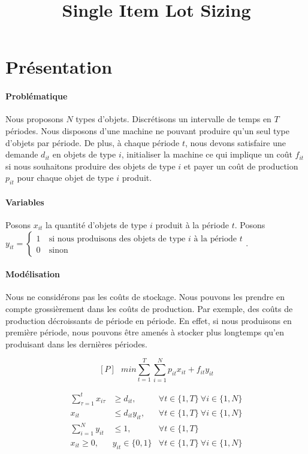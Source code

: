\documentclass[12pt,a4paper]{article}
\title{Single Item Lot Sizing}
\date{}
\begin{document}
	\maketitle
	
	\section*{Présentation}
	
	\paragraph{Problématique} Nous proposons $N$ types d'objets. Discrétisons un intervalle de temps en $T$ périodes. Nous disposons d'une machine ne pouvant produire qu'un seul type d'objets par période. \medbreak De plus, à chaque période $t$, nous devons satisfaire une demande $d_{it}$ en objets de type $i$, initialiser la machine ce qui implique un coût $f_{it}$ si nous souhaitons produire des objets de type $i$ et payer un coût de production $p_{it}$ pour chaque objet de type $i$ produit.
	
	\paragraph{Variables}
	Posons $x_{it}$ la quantité d'objets de type $i$ produit à la période $t$. \medbreak Posons $y_{it} = \left\lbrace \begin{aligned}
	1 ~& \text{si nous produisons des objets de type }i \text{ à la période } t \\
	0 ~& \text{sinon}
\end{aligned}	 \right.$.

 	\paragraph{Modélisation} Nous ne considérons pas les coûts de stockage. Nous pouvons les prendre en compte grossièrement dans les coûts de production. Par exemple, des coûts de production décroissants de période en période. En effet, si nous produisons en première période, nous pouvons être amenés à stocker plus longtemps qu'en produisant dans les dernières périodes.
 	
 	$$ [P] ~~~ min \sum_{t=1}^{T} \sum_{i=1}^{N} p_{it}x_{it} + f_{it} y_{it} $$ 		
 	
	\begin{eqnarray}	
 		\sum_{\tau=1}^{t} x_{i \tau} &\geq d_{it}, & \forall t \in \{1,T\} ~ \forall i \in \{1,N\} \\
 		x_{it} &\leq d_{it}y_{it}, & \forall t \in \{1,T\} ~ \forall i \in \{1,N\} \\
 		\sum_{i=1}^{N} y_{it} &\leq 1, & \forall t \in \{1,T\} \\
 		x_{it} \geq 0,& y_{it} \in \{0, 1\} &  \forall t \in \{1,T\} ~ \forall i \in \{1,N\} \nonumber
 	\end{eqnarray}	
 	
\end{document}

